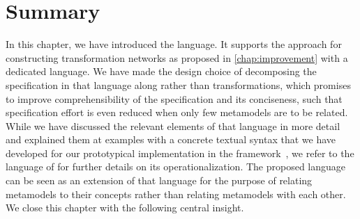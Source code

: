 \section{Summary}

In this chapter, we have introduced the \commonalities language.
It supports the \commonalities approach for constructing transformation networks as proposed in \autoref{chap:improvement} with a dedicated language.
We have made the design choice of decomposing the specification in that language along \commonalities rather than transformations, which promises to improve comprehensibility of the specification and its conciseness, such that specification effort is even reduced when only few metamodels are to be related.
While we have discussed the relevant elements of that language in more detail and explained them at examples with a concrete textual syntax that we have developed for our prototypical implementation in the \vitruv framework~, we refer to the \mappings language of \textcite{kramer2017a} for further details on its operationalization.
The proposed \commonalities language can be seen as an extension of that \mappings language for the purpose of relating metamodels to their concepts rather than relating metamodels with each other.
We close this chapter with the following central insight.

